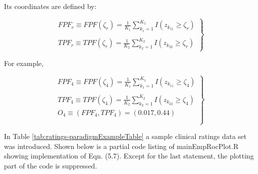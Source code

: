 \documentclass[
]{book}
\begin{document}
Its coordinates are defined by:

\begin{equation} 
\left.
\begin{aligned}
FPF_r \equiv FPF\left ( \zeta_r \right )=\frac {1} {K_1} \sum_{k_1=1}^{K_1}I \left ( z_{k_11} \geq  \zeta_r\right ) \\
\\
TPF_r \equiv TPF\left ( \zeta_r \right )=\frac {1} {K_2} \sum_{k_2=1}^{K_2} I\left ( z_{k_22} \geq  \zeta_r\right )
\end{aligned}
\right \}
\label{eq:empirical-OperatingPointFPF-TPF-r}
\end{equation}

For example,

\begin{equation} 
\left.
\begin{aligned}
FPF_4 \equiv FPF\left ( \zeta_4 \right )=\frac {1} {K_1} \sum_{k_1=1}^{K_1}I \left ( z_{k_11} \geq  \zeta_4\right ) \\
\\
TPF_4 \equiv TPF\left ( \zeta_4 \right )=\frac {1} {K_2} \sum_{k_2=1}^{K_2} I\left ( z_{k_22} \geq  \zeta_4\right )
\\
O_4 \equiv \left ( FPF_4, TPF_4 \right ) = \left ( 0.017, 0.44 \right )\\
\\
\end{aligned}
\right \}
\label{eq:empirical-OperatingPointFPF-TPF-4}
\end{equation}

In Table \ref{tab:ratings-paradigmExampleTable} a sample clinical ratings data set was introduced. Shown below is a partial code listing of mainEmpRocPlot.R showing implementation of Eqn. (5.7). Except for the last statement, the plotting part of the code is suppressed.
\end{document}
